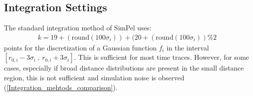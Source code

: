 \documentclass[pdftex,bezier,german,a4,twoside, headexclude,12pt,nochapterprefix, titlepage]{extarticle}
\newcommand{\simpel}{\textsf{SimPel}}
\newcommand{\figspace}{\hspace{0.5cm}}
\begin{document}
\subsection{Integration Settings}
The standard  integration method of \simpel{} uses:
\begin{align*}
k =  19+(\mathrm{round}(100\sigma_i)) + (20+(\mathrm{round}(100\sigma_i))\%2
\end{align*}
points for the discretization of a Gaussian function $f_i$ in the interval
$[r_{0,i}-3\sigma_i \ ,\ r_{0,i}+3\sigma_i]$. This is sufficient for most time traces. However, for some cases, especially
if broad distance distributions are present in the small distance region, this is not sufficient and simulation noise is observed
(\autoref{Integration_mehtods_comparison}).
\begin{figure}[!htb]
\centering
     \figspace
      \\[-0.3cm]

\end{figure}
\end{document}
